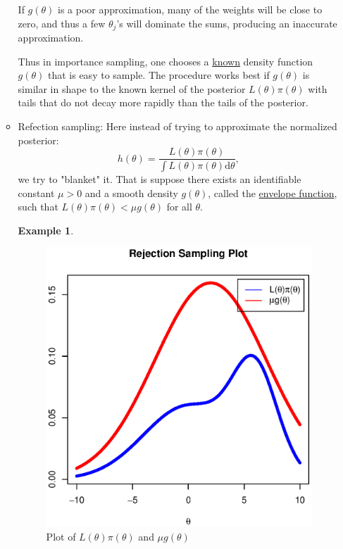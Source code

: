 \documentclass[lecture,12pt,]{pcms-l}
\numberwithin{section}{chapter}
\numberwithin{equation}{chapter}
\theoremstyle{plain}
\theoremstyle{definition}
\newtheorem{example}{Example}[section]
\theoremstyle{definition}
\begin{document}
\begin{enumerate}
\begin{itemize}
If $g(\theta)$ is a poor approximation, many of the weights will be close to zero, and thus a few $\theta_j$'s will dominate the sums, producing an inaccurate approximation.

Thus in importance sampling, one chooses a \underline{known} density function $g(\theta)$ that is easy to sample. The procedure works best if $g(\theta)$ is similar in shape to the known kernel of the posterior $L(\theta) \pi(\theta)$ with tails that do not decay more rapidly than the tails of the posterior.
\item Refection sampling: Here instead of trying to approximate the normalized posterior:
\begin{equation}
h(\theta)=\frac{L(\theta)\pi(\theta)}{\int L(\theta)\pi(\theta) \mathrm{d} \theta},
\end{equation} 
we try to "blanket" it. That is suppose there exists an identifiable constant $\mu > 0$ and a smooth density $g(\theta)$, called the \underline{envelope function}, such that $L(\theta) \pi(\theta)  < \mu g(\theta)$ for all $\theta$.
\begin{example}

\begin{figure}[h!]
 \includegraphics[scale=0.6]{Rejection}%
  \caption{Plot of $L(\theta) \pi(\theta)$ and $\mu g(\theta)$ }
\label{fig:RejectionSampling}
\end{figure}


\end{example}
\end{itemize}
\end{enumerate}
\end{document}
